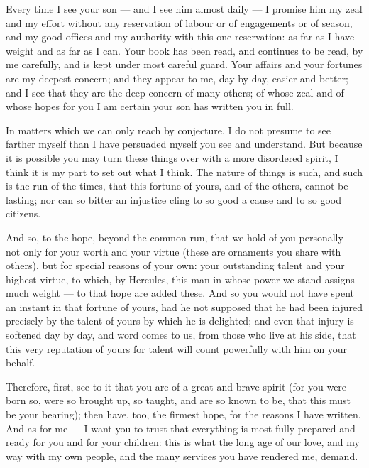 

 Every time I see your son --- and I see him almost daily --- I promise him my zeal and my effort without any reservation of labour or of engagements or of season, and my good offices and my authority with this one reservation: as far as I have weight and as far as I can. Your book has been read, and continues to be read, by me carefully, and is kept under most careful guard. Your affairs and your fortunes are my deepest concern; and they appear to me, day by day, easier and better; and I see that they are the deep concern of many others; of whose zeal and of whose hopes for you I am certain your son has written you in full.

 In matters which we can only reach by conjecture, I do not presume to see farther myself than I have persuaded myself you see and understand. But because it is possible you may turn these things over with a more disordered spirit, I think it is my part to set out what I think. The nature of things is such, and such is the run of the times, that this fortune of yours, and of the others, cannot be lasting; nor can so bitter an injustice cling to so good a cause and to so good citizens.

 And so, to the hope, beyond the common run, that we hold of you personally --- not only for your worth and your virtue (these are ornaments you share with others), but for special reasons of your own: your outstanding talent and your highest virtue, to which, by Hercules, this man in whose power we stand assigns much weight --- to that hope are added these. And so you would not have spent an instant in that fortune of yours, had he not supposed that he had been injured precisely by the talent of yours by which he is delighted; and even that injury is softened day by day, and word comes to us, from those who live at his side, that this very reputation of yours for talent will count powerfully with him on your behalf.

 Therefore, first, see to it that you are of a great and brave spirit (for you were born so, were so brought up, so taught, and are so known to be, that this must be your bearing); then have, too, the firmest hope, for the reasons I have written. And as for me --- I want you to trust that everything is most fully prepared and ready for you and for your children: this is what the long age of our love, and my way with my own people, and the many services you have rendered me, demand.
